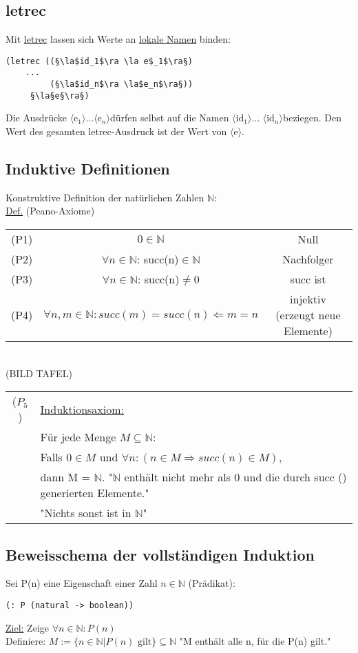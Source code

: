 \documentclass[a4paper,12pt]{article}
\newcommand{\la}{$\langle$}
\newcommand{\ra}{$\rangle$}
\begin{document}
\subsection{letrec}
Mit \uline{letrec} lassen sich Werte an \uline{lokale Namen} binden:
\begin{lstlisting}[style=customc]
(letrec ((§\la$id_1$\ra \la e$_1$\ra§)
	...
         (§\la$id_n$\ra \la$e_n$\ra§))
     §\la§e§\ra§)
\end{lstlisting} 
Die Ausdrücke \la$\text{e}_1$\ra...\la e$_n$\ra dürfen selbst auf die Namen \la $\text{id}_1$\ra ... \la$\text{id}_n$\ra beziegen. Den Wert des gesamten letrec-Ausdruck ist der Wert von \la e\ra.
\subsection{Induktive Definitionen}
Konstruktive Definition der natürlichen Zahlen $\mathbb{N}$:\\
\uline{Def.} (Peano-Axiome)\\
\begin{tabular}{ccc}
(P1) & $ 0 \in \mathbb{N}$ & Null \\
(P2) & $\forall n \in \mathbb{N}$:  succ(n)$\in\mathbb{N}$ & Nachfolger \\
(P3) & $\forall n \in \mathbb{N}$:  succ(n)$\neq0$                     &    succ ist \\
(P4) & $ \forall n,m \in \mathbb{N}: succ(m) =succ(n) \Leftarrow m = n$ &  injektiv (erzeugt neue Elemente)\\
\end{tabular}\\
(BILD TAFEL)\\
\begin{tabular}{cl}
($P_5$) & \uline{Induktionsaxiom:}\\
 & Für jede Menge $M\subseteq \mathbb{N}$: \\
 & Falls $0\in M$ und $\forall n : (n \in M \Rightarrow succ(n)\in M)$,\\
 & dann M = $\mathbb{N}$. "$\mathbb{N}$ enthält nicht mehr als 0 und die durch succ () generierten Elemente." \\
 & "Nichts sonst ist in $\mathbb{N}$" \\
\end{tabular}

\subsection{Beweisschema der vollständigen Induktion}
Sei P(n) eine Eigenschaft einer Zahl $n \in \mathbb{N}$ (Prädikat):
\begin{lstlisting}
(: P (natural -> boolean))
\end{lstlisting}
\uline{Ziel:} Zeige $\forall n \in \mathbb{N}: P(n)$\\
Definiere: $M:=\{n \in \mathbb{N}| P(n) \text{ gilt}\} \subseteq \mathbb{N}$ "M enthält alle n, für die P(n) gilt."\\
\end{document}
